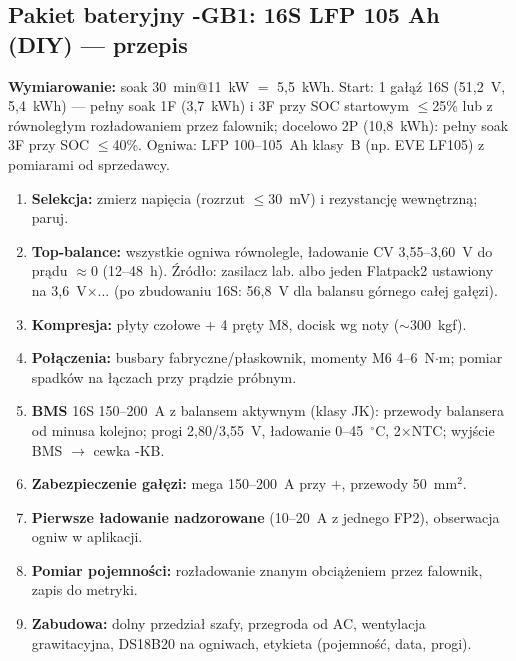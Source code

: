 \documentclass[11pt,a4paper]{article}
\begin{document}
\subsection{Pakiet bateryjny -GB1: 16S LFP 105 Ah (DIY) --- przepis}
\label{sec:pakiet}
\textbf{Wymiarowanie:} soak 30~min@11~kW $=$ 5,5~kWh. Start: 1 gałąź 16S (51,2~V, 5,4~kWh) ---
pełny soak 1F (3,7~kWh) i 3F przy SOC startowym $\le$25\% lub z równoległym rozładowaniem przez
falownik; docelowo 2P (10,8~kWh): pełny soak 3F przy SOC $\le$40\%. Ogniwa: LFP 100--105~Ah
klasy~B (np. EVE LF105) z pomiarami od sprzedawcy.
\begin{enumerate}
\item \textbf{Selekcja:} zmierz napięcia (rozrzut $\le$30~mV) i rezystancję wewnętrzną; paruj.
\item \textbf{Top-balance:} wszystkie ogniwa równolegle, ładowanie CV 3,55--3,60~V do prądu
$\approx$0 (12--48~h). Źródło: zasilacz lab. albo jeden Flatpack2 ustawiony na 3,6~V$\times$...
(po zbudowaniu 16S: 56,8~V dla balansu górnego całej gałęzi).
\item \textbf{Kompresja:} płyty czołowe + 4 pręty M8, docisk wg noty ($\sim$300~kgf).
\item \textbf{Połączenia:} busbary fabryczne/płaskownik, momenty M6 4--6~N$\cdot$m; pomiar spadków
na łączach przy prądzie próbnym.
\item \textbf{BMS} 16S 150--200~A z balansem aktywnym (klasy JK): przewody balansera od minusa
kolejno; progi 2,80/3,55~V, ładowanie 0--45~$^\circ$C, 2$\times$NTC; wyjście BMS $\to$ cewka -KB.
\item \textbf{Zabezpieczenie gałęzi:} mega 150--200~A przy $+$, przewody 50~mm$^2$.
\item \textbf{Pierwsze ładowanie nadzorowane} (10--20~A z jednego FP2), obserwacja ogniw w aplikacji.
\item \textbf{Pomiar pojemności:} rozładowanie znanym obciążeniem przez falownik, zapis do metryki.
\item \textbf{Zabudowa:} dolny przedział szafy, przegroda od AC, wentylacja grawitacyjna, DS18B20
na ogniwach, etykieta (pojemność, data, progi).
\end{enumerate}
\end{document}
